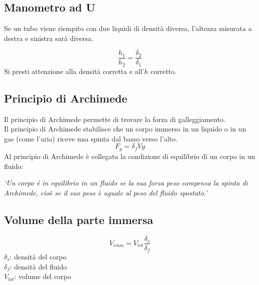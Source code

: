 \subsection{Manometro ad U}
Se un tubo viene riempito con due liquidi di densità diversa, l'altezza misurata a destra e 
sinistra sarà diversa.
\begin{center}
\end{center}
\begin{equation*}
  \frac{h_1}{h_2} = \frac{\delta_2}{\delta_1}
\end{equation*}
Si presti attenzione alla densità corretta e all'$h$ corretto.

\subsection{Principio di Archimede}
Il principio di Archimede permette di trovare la forza di galleggiamento.\\
Il principio di Archimede stabilisce che un corpo immerso in un liquido o in un gas (come l'aria) 
riceve una spinta dal basso verso l'alto.
\begin{equation*}
F_g = \delta_fVg
\end{equation*}
Al principio di Archimede è collegata la condizione di equilibrio di un corpo in un fluido:\\
\begin{center}
	\emph{`Un corpo è in equilibrio in un fluido se la sua forza peso compensa la spinta di 
		Archimede, cioè se il suo peso è uguale al peso del fluido spostato.'}
\end{center}

\subsection{Volume della parte immersa}
\begin{equation*}
  V_{imm} = V_{tot}\frac{\delta_s}{\delta_f}
\end{equation*}
$\delta_s$: densità del corpo\\
$\delta_f$: densità del fluido\\
$V_{tot}$: volume del corpo


